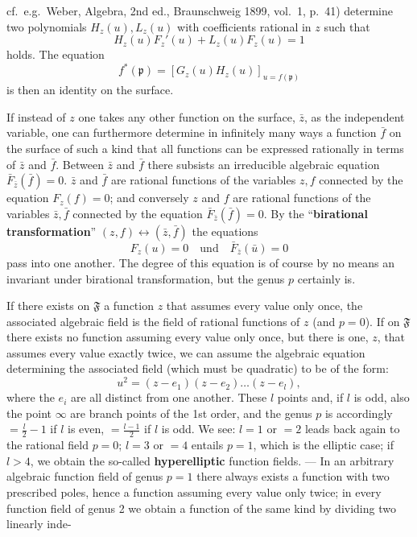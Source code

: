 \documentclass{article}
\begin{document}
cf.\ e.g.\ Weber, Algebra, 2nd ed., Braunschweig 1899, vol.~1, p.~41) determine two polynomials $H_z(u), L_z(u)$ with coefficients rational in $z$ such that
\[ H_z(u) F_z'(u) + L_z(u) F_z(u) = 1 \]
holds. The equation
\[ f^*(\mathfrak{p}) = [G_z(u) H_z(u)]_{u = f(\mathfrak{p})} \]
is then an identity on the surface.

If instead of $z$ one takes any other function on the surface, $\bar{z}$, as the independent variable, one can furthermore determine in infinitely many ways a function $\bar{f}$ on the surface of such a kind that all functions can be expressed rationally in terms of $\bar{z}$ and $\bar{f}$. Between $\bar{z}$ and $\bar{f}$ there subsists an irreducible algebraic equation $\bar{F}_{\bar{z}}(\bar{f}) = 0$. $\bar{z}$ and $\bar{f}$ are rational functions of the variables $z, f$ connected by the equation $F_z(f) = 0$; and conversely $z$ and $f$ are rational functions of the variables $\bar{z}, \bar{f}$ connected by the equation $\bar{F}_{\bar{z}}(\bar{f}) = 0$. By the ``\textbf{birational transformation}'' $(z, f) \longleftrightarrow (\bar{z}, \bar{f})$ the equations
\[ F_z(u) = 0 \quad \text{und} \quad \bar{F}_{\bar{z}}(\bar{u}) = 0 \]
pass into one another. The degree of this equation is of course by no means an invariant under birational transformation, but the genus $p$ certainly is.

If there exists on $\mathfrak{F}$ a function $z$ that assumes every value only once, the associated algebraic field is the field of rational functions of $z$ (and $p = 0$). If on $\mathfrak{F}$ there exists no function assuming every value only once, but there is one, $z$, that assumes every value exactly twice, we can assume the algebraic equation determining the associated field (which must be quadratic) to be of the form:
\[ u^2 = (z - e_1)(z - e_2) \dots (z - e_l), \]
where the $e_i$ are all distinct from one another. These $l$ points and, if $l$ is odd, also the point $\infty$ are branch points of the 1st order, and the genus $p$ is accordingly $= \frac{l}{2} - 1$ if $l$ is even, $= \frac{l - 1}{2}$ if $l$ is odd. We see: $l = 1$ or $= 2$ leads back again to the rational field $p = 0$; $l = 3$ or $= 4$ entails $p = 1$, which is the elliptic case; if $l > 4$, we obtain the so-called \textbf{hyperelliptic} function fields. --- In an arbitrary algebraic function field of genus $p = 1$ there always exists a function with two prescribed poles, hence a function assuming every value only twice; in every function field of genus 2 we obtain a function of the same kind by dividing two linearly inde-
\end{document}
